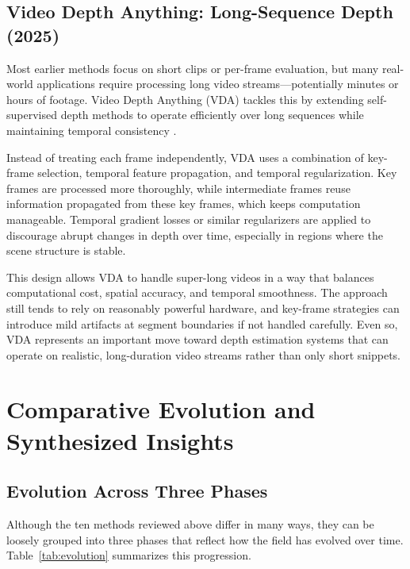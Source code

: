 \documentclass[10pt,twocolumn,letterpaper]{article}
\begin{document}
\subsection{Video Depth Anything: Long-Sequence Depth (2025)}

Most earlier methods focus on short clips or per-frame evaluation, but many real-world applications require processing long video streams—potentially minutes or hours of footage. Video Depth Anything (VDA) tackles this by extending self-supervised depth methods to operate efficiently over long sequences while maintaining temporal consistency \cite{chen2025video}.

Instead of treating each frame independently, VDA uses a combination of key-frame selection, temporal feature propagation, and temporal regularization. Key frames are processed more thoroughly, while intermediate frames reuse information propagated from these key frames, which keeps computation manageable. Temporal gradient losses or similar regularizers are applied to discourage abrupt changes in depth over time, especially in regions where the scene structure is stable.

This design allows VDA to handle super-long videos in a way that balances computational cost, spatial accuracy, and temporal smoothness. The approach still tends to rely on reasonably powerful hardware, and key-frame strategies can introduce mild artifacts at segment boundaries if not handled carefully. Even so, VDA represents an important move toward depth estimation systems that can operate on realistic, long-duration video streams rather than only short snippets.

\section{Comparative Evolution and Synthesized Insights}
\label{sec:comparative}

\subsection{Evolution Across Three Phases}

Although the ten methods reviewed above differ in many ways, they can be loosely grouped into three phases that reflect how the field has evolved over time. Table~\ref{tab:evolution} summarizes this progression.
\end{document}
